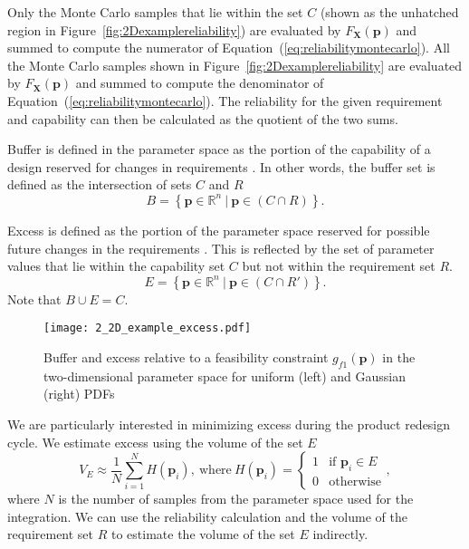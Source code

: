 Only the Monte Carlo samples that lie within the set $C$ (shown as the unhatched region in Figure~\ref{fig:2Dexamplereliability}) are evaluated by $F_{\mathbf{X}}(\mathbf{p})$ and summed to compute the numerator of Equation~(\ref{eq:reliabilitymontecarlo}). All the Monte Carlo samples shown in Figure~\ref{fig:2Dexamplereliability} are evaluated by $F_{\mathbf{X}}(\mathbf{p})$ and summed to compute the denominator of Equation~(\ref{eq:reliabilitymontecarlo}). The reliability for the given requirement and capability can then be calculated as the quotient of the two sums.

Buffer is defined in the parameter space as the portion of the capability of a design reserved for changes in requirements \cite{Eckert2019}. In other words, the buffer set is defined as the intersection of sets $C$ and $R$
%
\begin{equation} \label{eq:buffer}
	\textit{B} = \left\{\mathbf{p} \in \mathbb{R}^n~|~\mathbf{p} \in \left(C\cap R\right) \right\}.
\end{equation}

Excess is defined as the portion of the parameter space reserved for possible future changes in the requirements \cite{Eckert2019}. This is reflected by the set of parameter values that lie within the capability set $C$ but not within the requirement set $R$.
% 
\begin{equation} \label{eq:excess}
	\textit{E} = \left\{\mathbf{p} \in \mathbb{R}^n~|~\mathbf{p} \in \left(C\cap R'\right) \right\}.
\end{equation}
%
Note that  $B\cup E = C$.

%
\begin{figure}[h]
	\centering
	\texttt{[image: 2\_2D\_example\_excess.pdf]}
	\caption{Buffer and excess relative to a feasibility constraint $g_{f1}(\mathbf{p})$ in the two-dimensional parameter space for uniform (left) and Gaussian (right)  \acp{PDF}}
	\label{fig:2Dexampleexcess}
\end{figure}

We are particularly interested in minimizing excess during the product redesign cycle. We estimate excess using the volume of the set $E$ 
%
\begin{equation} \label{eq:excessmontecarlo}
	V_E \approx \dfrac{1}{N} {\sum\limits_{i=1}^{N} H\left(\mathbf{p}_i\right)}, ~\mathrm{where}~ H\left(\mathbf{p}_i\right)={\begin{cases}1&{\text{if }}\mathbf{p}_i\in E\\0&{\text{otherwise}}\end{cases}},
\end{equation}
%
where $N$ is the number of samples from the parameter space used for the integration. We can use the reliability calculation and the volume of the requirement set $R$ to estimate the volume of the set $E$ indirectly. 

